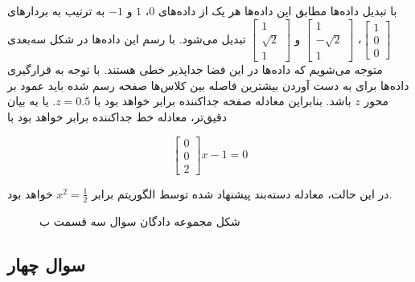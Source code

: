 \documentclass{article}
\begin{document}
با تبدیل داده‌ها مطابق این داده‌ها هر یک از داده‌های $0$، $1$ و $-1$ به ترتیب به بردار‌های
$\begin{bmatrix}1\\ 0\\ 0\end{bmatrix}$، $\begin{bmatrix}1\\ -\sqrt{2}\\ 1\end{bmatrix}$ و $\begin{bmatrix}1\\ \sqrt{2}\\ 1\end{bmatrix}$
تبدیل می‌شود. با رسم این داده‌ها در شکل سه‌بعدی متوجه می‌شویم که داده‌ها در این فضا جداپذیر خطی هستند.
با توجه به قرارگیری داده‌ها برای به دست آوردن بیشترین فاصله بین کلاس‌ها صفحه رسم شده باید عمود بر محور
$z$ باشد. بنابراین معادله صفحه جداکننده برابر خواهد بود با $z=0.5$. یا به بیان دقیق‌تر، معادله خط
جداکننده برابر خواهد بود با

$$\begin{bmatrix}0\\ 0\\ 2\end{bmatrix}x - 1 =0$$

در این حالت، معادله دسته‌بند پیشنهاد شده توسط الگوریتم  برابر $x^2=\frac{1}{2}$ خواهد بود.

\begin{figure}[h]
    \centering
    \caption{شکل مجموعه دادگان سوال سه قسمت ب}
    \label{question3-partb}
\end{figure}

\subsection*{سوال چهار}
\end{document}
